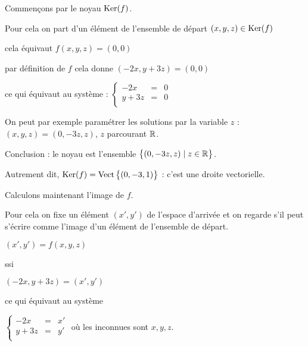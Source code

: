 Commençons par le noyau $\mathop{\text{Ker}}\nolimits(f)$.

\change

Pour cela on part d'un élément de l'ensemble de départ $(x,y,z) \in \mathop{\text{Ker}}\nolimits(f)$

\change

cela équivaut $f(x,y,z)=(0,0)$

\change

par définition de $f$ cela donne $(-2x,y+3z)=(0,0)$

\change 

ce qui équivaut au système : $\left\{\begin{array}{rcl}
             -2x  & = & 0 \\
             y+3z & = & 0 \\
          \end{array}\right.$
          
\change

On peut par exemple paramétrer les solutions par la variable $z$ :
$(x,y,z) = (0,-3z,z)$, $z$ parcourant $\mathbb{R}$.


\change

Conclusion : le noyau est l'ensemble $\big\{ (0,-3z,z) \mid  z \in \mathbb{R} \big\}$.

\change

Autrement dit, $\mathop{\text{Ker}}\nolimits(f) = \mathop{\text{Vect}}\nolimits\big\{ (0,-3,1) \big\}$ : c'est une droite vectorielle. 

\change

Calculons maintenant l'image de $f$.

\change

Pour cela on fixe un élément $(x',y')$ de l'espace d'arrivée et on regarde 
s'il peut s'écrire comme l'image d'un élément de l'ensemble de départ.

\change

$(x',y')= f(x,y,z)$

ssi 

\change 

$(-2x,y+3z)=(x',y')$

\change

ce qui équivaut au système 

$\left\{\begin{array}{rcl}
             -2x  & = & x' \\
             y+3z & = & y' \\
          \end{array}\right.$
où les inconnues sont $x,y,z$.
          
\change


